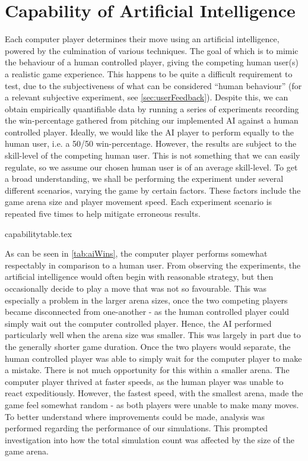 \documentclass{standalone}
\begin{document}
	\section{Capability of Artificial Intelligence} \label{sec:aiCapabilities}
		Each computer player determines their move using an artificial intelligence, powered by the culmination of various techniques. The goal of which is to mimic the behaviour of a human controlled player, giving the competing human user(s) a realistic game experience. This happens to be quite a difficult requirement to test, due to the subjectiveness of what can be considered \enquote{human behaviour} (for a relevant subjective experiment, see \autoref{sec:userFeedback}). Despite this, we can obtain empirically quantifiable data by running a series of experiments recording the win-percentage gathered from pitching our implemented AI against a human controlled player. Ideally, we would like the AI player to perform equally to the human user, i.e. a 50/50 win-percentage. However, the results are subject to the skill-level of the competing human user. This is not something that we can easily regulate, so we assume our chosen human user is of an average skill-level. To get a broad understanding, we shall be performing the experiment under several different scenarios, varying the game by certain factors. These factors include the game arena size and player movement speed. Each experiment scenario is repeated five times to help mitigate erroneous results.

		{capabilitytable.tex}

		As can be seen in \autoref{tab:aiWins}, the computer player performs somewhat respectably in comparison to a human user. From observing the experiments, the artificial intelligence would often begin with reasonable strategy, but then occasionally decide to play a move that was not so favourable. This was especially a problem in the larger arena sizes, once the two competing players became disconnected from one-another - as the human controlled player could simply wait out the computer controlled player. Hence, the AI performed particularly well when the arena size was smaller. This was largely in part due to the generally shorter game duration. Once the two players would separate, the human controlled player was able to simply wait for the computer player to make a mistake. There is not much opportunity for this within a smaller arena. The computer player thrived at faster speeds, as the human player was unable to react expeditiously. However, the fastest speed, with the smallest arena, made the game feel somewhat random - as both players were unable to make many moves. To better understand where improvements could be made, analysis was performed regarding the performance of our simulations. This prompted investigation into how the total simulation count was affected by the size of the game arena.
\end{document}
